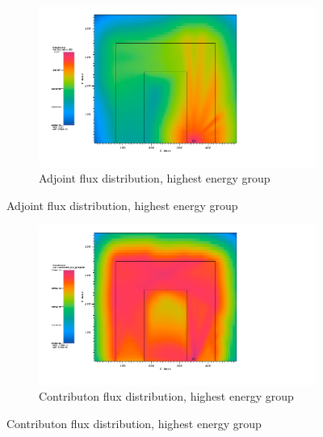 \begin{figure}[htb!]
  \centering
  \begin{subfigure}[t]{\textwidth}
    \includegraphics[width=0.9\linewidth]{./chapters/characterization_probs/figures/char/prob_2/prob2adjG00.png}
    \caption{Adjoint flux distribution, highest energy group}
    \label{fig:ubendadjflux}
  \end{subfigure}
\end{figure}
\begin{figure}[htb!]\ContinuedFloat
  \centering
  \begin{subfigure}[t]{\textwidth}
    \includegraphics[width=0.9\linewidth]{./chapters/characterization_probs/figures/char/prob_2/prob2contribG00.png}
    \caption{Contributon flux distribution, highest energy group}
    \label{fig:ubendcontribflux}
  \end{subfigure}
\end{figure}
